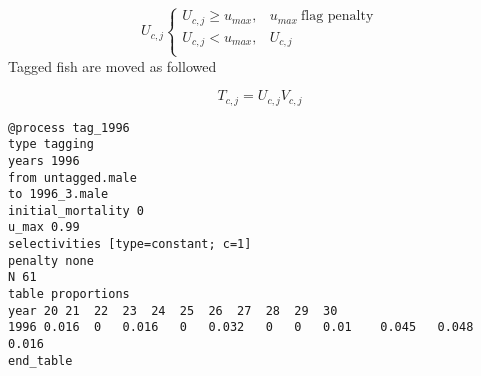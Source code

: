 \begin{equation*}
U_{c,j}
\begin{cases}
	U_{c,j} \geq u_{max}, & u_{max} \ \text{flag penalty}\\
	U_{c,j} < u_{max}, & U_{c,j} \\
\end{cases}
\end{equation*}
Tagged fish are moved as followed

\begin{equation*}
	T_{c,j} = U_{c,j} V_{c,j}
\end{equation*}

{\small{\begin{verbatim}
@process tag_1996
type tagging
years 1996
from untagged.male
to 1996_3.male
initial_mortality 0
u_max 0.99
selectivities [type=constant; c=1]
penalty none
N 61
table proportions
year 20	21	22	23	24	25	26	27	28	29	30
1996 0.016	0	0.016	0	0.032	0	0	0.01	0.045	0.048	0.016	
end_table
\end{verbatim}}}
